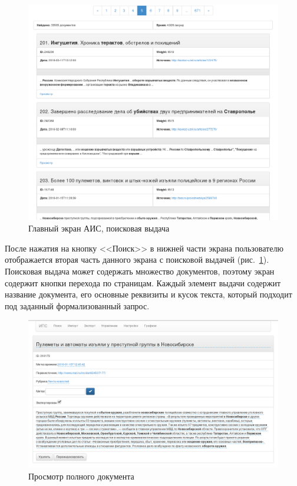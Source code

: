   \begin{figure}[h!]
  \centering
  \includegraphics[width=0.9\linewidth]{technology/gui_main_results}
  \caption{Главный экран АИС, поисковая выдача}
  \label{figure:guiMainResults}
  \end{figure}

  После нажатия на кнопку <<Поиск>> в нижней части экрана пользователю отображается вторая часть данного экрана с поисковой выдачей (рис.~\ref{figure:guiMainResults}). Поисковая выдача может содержать множество документов, поэтому экран содержит кнопки перехода по страницам. Каждый элемент выдачи содержит название документа, его основные реквизиты и кусок текста, который подходит под заданный формализованный запрос. 

  \begin{figure}[h!]
  \centering
  \includegraphics[width=0.9\linewidth]{technology/gui_main_document}
  \caption{Просмотр полного документа}
  \label{figure:guiMainDocument}
  \end{figure}

